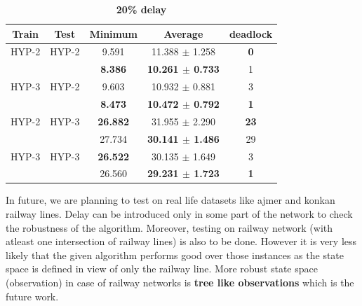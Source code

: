 \begin{table}[H]
    \centering
    \caption{\textbf{20\% delay}}    
        \begin{tabular}{ c c c c c } 
         \hline
         \textbf{Train} & \textbf{Test} & \textbf{Minimum} & \textbf{Average} & \textbf{deadlock} \\
         \hline
         \hline
         HYP-2 & HYP-2 & 9.591 & 11.388 $\pm$ 1.258 & \textbf{0} \\
         & & \textbf{8.386} & \textbf{10.261 $\pm$ 0.733} & 1 \\
     
         HYP-3 & HYP-2 & 9.603 & 10.932 $\pm$ 0.881 & 3 \\
         & & \textbf{8.473} & \textbf{10.472 $\pm$ 0.792} & \textbf{1} \\
     
         HYP-2 & HYP-3 & \textbf{26.882} & 31.955 $\pm$ 2.290 & \textbf{23} \\
         & & 27.734 & \textbf{30.141 $\pm$ 1.486} & 29 \\
     
         HYP-3 & HYP-3 & \textbf{26.522} & 30.135 $\pm$ 1.649 & 3 \\
         & & 26.560 & \textbf{29.231 $\pm$ 1.723} & \textbf{1} \\
        \hline
        \end{tabular}
\end{table}

In future, we are planning to test on real life datasets like ajmer and konkan railway lines. Delay can be 
introduced only in some part of the network to check the robustness of the algorithm. Moreover, testing on railway
network (with atleast one intersection of railway lines) is also to be done. However it is very less likely that the 
given algorithm performs good over those instances as the state space is defined in view of only the railway line.
More robust state space (observation) in case of railway networks is \textbf{tree like observations} which is the 
future work.

